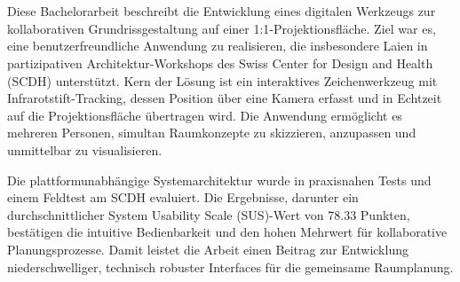 \section*{}
Diese Bachelorarbeit beschreibt die Entwicklung eines digitalen Werkzeugs zur kollaborativen Grundrissgestaltung auf einer 1:1-Projektionsfläche. Ziel war es, eine benutzerfreundliche Anwendung zu realisieren, die insbesondere Laien in partizipativen Architektur-Workshops des Swiss Center for Design and Health (SCDH) unterstützt. Kern der Lösung ist ein interaktives Zeichenwerkzeug mit Infrarotstift-Tracking, dessen Position über eine Kamera erfasst und in Echtzeit auf die Projektionsfläche übertragen wird. Die Anwendung ermöglicht es mehreren Personen, simultan Raumkonzepte zu skizzieren, anzupassen und unmittelbar zu visualisieren.

Die plattformunabhängige Systemarchitektur wurde in praxisnahen Tests und einem Feldtest am SCDH evaluiert. Die Ergebnisse, darunter ein durchschnittlicher System Usability Scale (SUS)-Wert von 78.33 Punkten, bestätigen die intuitive Bedienbarkeit und den hohen Mehrwert für kollaborative Planungsprozesse. Damit leistet die Arbeit einen Beitrag zur Entwicklung niederschwelliger, technisch robuster Interfaces für die gemeinsame Raumplanung.

